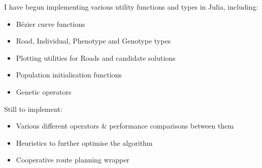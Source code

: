 \documentclass{beamer} \usepackage{pgfpages} \setbeamertemplate{bibliography item}{\insertbiblabel}
\begin{document}
\begin{frame}
    I have begun implementing various utility functions and types in Julia\cite{JuliaProgrammingLanguage}, including:

    \begin{itemize}
        \item Bézier curve functions
        \item Road, Individual, Phenotype and Genotype types
        \item Plotting utilities for Roads and candidate solutions
        \item Population initialisation functions
        \item Genetic operators
    \end{itemize}

    Still to implement: 

    \begin{itemize}
        \item Various different operators \& performance comparisons between them
        \item Heuristics to further optimise the algorithm
        \item Cooperative route planning wrapper
    \end{itemize}

\end{frame}
\end{document}

